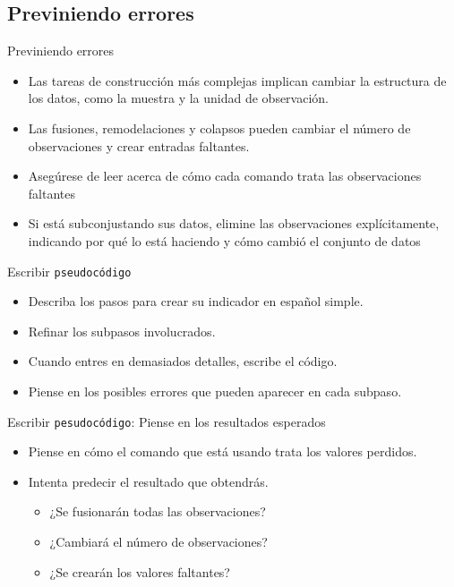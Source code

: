 \documentclass[10pt, aspectratio=169, compress]{beamer}
\begin{document}
\subsection{Previniendo errores}
\begin{frame}{Previniendo errores}
	\begin{itemize}
		\item Las tareas de construcción más complejas implican cambiar la estructura de los datos, como la muestra y la unidad de observación.
		\item Las fusiones, remodelaciones y colapsos pueden cambiar el número de observaciones y crear entradas faltantes.
		\item Asegúrese de leer acerca de cómo cada comando trata las observaciones faltantes
		\item Si está subconjustando sus datos, elimine las observaciones explícitamente, indicando por qué lo está haciendo y cómo cambió el conjunto de datos
	\end{itemize}
\end{frame}
\begin{frame}{Escribir \texttt{pseudocódigo}}
	\begin{itemize}
		\item Describa los pasos para crear su indicador en español simple.
		\item Refinar los subpasos involucrados.
		\item Cuando entres en demasiados detalles, escribe el código.
		\item Piense en los posibles errores que pueden aparecer en cada subpaso.
	\end{itemize}
\end{frame}
\begin{frame}{Escribir \texttt{pesudocódigo}: Piense en los resultados esperados}
	\begin{itemize}
		\item Piense en cómo el comando que está usando trata los valores perdidos.
		\item Intenta predecir el resultado que obtendrás.
		\begin{itemize}
			\item ¿Se fusionarán todas las observaciones?
			\item ¿Cambiará el número de observaciones?
			\item ¿Se crearán los valores faltantes?
		\end{itemize}
	\end{itemize}
\end{frame}
\end{document}
